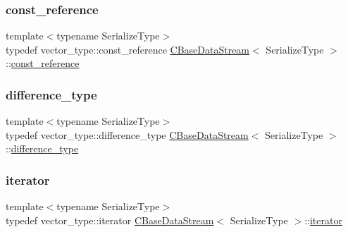 \mbox{\label{class_c_base_data_stream_aabfd39998036383d2ee384029f221aab}} 
\subsubsection{\texorpdfstring{const\+\_\+reference}{const\_reference}}
{\footnotesize\ttfamily template$<$typename Serialize\+Type$>$ \\
typedef vector\+\_\+type\+::const\+\_\+reference \mbox{\hyperlink{class_c_base_data_stream}{C\+Base\+Data\+Stream}}$<$ Serialize\+Type $>$\+::\mbox{\hyperlink{class_c_base_data_stream_aabfd39998036383d2ee384029f221aab}{const\+\_\+reference}}}

\mbox{\label{class_c_base_data_stream_a85d79377e715b717baa8cb68cf753bd0}} 
\subsubsection{\texorpdfstring{difference\+\_\+type}{difference\_type}}
{\footnotesize\ttfamily template$<$typename Serialize\+Type$>$ \\
typedef vector\+\_\+type\+::difference\+\_\+type \mbox{\hyperlink{class_c_base_data_stream}{C\+Base\+Data\+Stream}}$<$ Serialize\+Type $>$\+::\mbox{\hyperlink{class_c_base_data_stream_a85d79377e715b717baa8cb68cf753bd0}{difference\+\_\+type}}}

\mbox{\label{class_c_base_data_stream_a23e0e0af1c68dd36c27162036b6d048d}} 
\subsubsection{\texorpdfstring{iterator}{iterator}}
{\footnotesize\ttfamily template$<$typename Serialize\+Type$>$ \\
typedef vector\+\_\+type\+::iterator \mbox{\hyperlink{class_c_base_data_stream}{C\+Base\+Data\+Stream}}$<$ Serialize\+Type $>$\+::\mbox{\hyperlink{class_c_base_data_stream_a23e0e0af1c68dd36c27162036b6d048d}{iterator}}}

